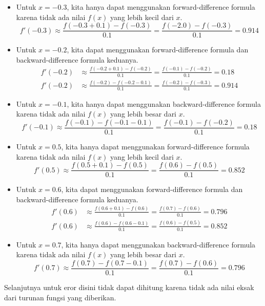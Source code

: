 \documentclass[a4paper,12pt]{article}
\begin{document}
\begin{itemize}
    \item Untuk $x = -0.3$, kita hanya dapat menggunakan forward-difference formula karena tidak ada nilai $f(x)$ yang lebih kecil dari $x$.
    \begin{equation*}
        f'(-0.3) \approx \frac{f(-0.3+0.1)-f(-0.3)}{0.1} = \frac{f(-2.0)-f(-0.3)}{0.1} = 0.914
    \end{equation*}
    \item Untuk $x = -0.2$, kita dapat menggunakan forward-difference formula dan backward-difference formula keduanya.
    \begin{align*}
        f'(-0.2) &\approx \frac{f(-0.2+0.1)-f(-0.2)}{0.1} = \frac{f(-0.1)-f(-0.2)}{0.1} = 0.18\\
        f'(-0.2) &\approx \frac{f(-0.2)-f(-0.2-0.1)}{0.1} = \frac{f(-0.2)-f(-0.3)}{0.1} = 0.914
    \end{align*}
    \item Untuk $x = -0.1$, kita hanya dapat menggunakan backward-difference formula karena tidak ada nilai $f(x)$ yang lebih besar dari $x$.
    \begin{equation*}
        f'(-0.1) \approx \frac{f(-0.1)-f(-0.1-0.1)}{0.1} = \frac{f(-0.1)-f(-0.2)}{0.1} = 0.18
    \end{equation*}
    \item Untuk $x = 0.5$, kita hanya dapat menggunakan forward-difference formula karena tidak ada nilai $f(x)$ yang lebih kecil dari $x$.
    \begin{equation*}
        f'(0.5) \approx \frac{f(0.5+0.1)-f(0.5)}{0.1} = \frac{f(0.6)-f(0.5)}{0.1} = 0.852
    \end{equation*}
    \item Untuk $x = 0.6$, kita dapat menggunakan forward-difference formula dan backward-difference formula keduanya.
    \begin{align*}
        f'(0.6) &\approx \frac{f(0.6+0.1)-f(0.6)}{0.1} = \frac{f(0.7)-f(0.6)}{0.1} = 0.796\\
        f'(0.6) &\approx \frac{f(0.6)-f(0.6-0.1)}{0.1} = \frac{f(0.6)-f(0.5)}{0.1} = 0.852
    \end{align*}
    \item Untuk $x = 0.7$, kita hanya dapat menggunakan backward-difference formula karena tidak ada nilai $f(x)$ yang lebih besar dari $x$.
    \begin{equation*}
        f'(0.7) \approx \frac{f(0.7)-f(0.7-0.1)}{0.1} = \frac{f(0.7)-f(0.6)}{0.1} = 0.796
    \end{equation*}
\end{itemize}
Selanjutnya untuk eror disini tidak dapat dihitung karena tidak ada nilai eksak dari turunan fungsi yang diberikan.
\end{document}

